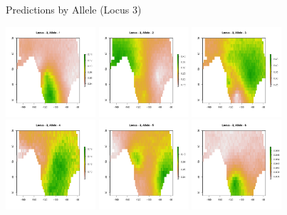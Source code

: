 \documentclass[11pt,ignorenonframetext,]{beamer}
\begin{document}
\begin{frame}{Predictions by Allele (Locus 3)}

\begin{center}
\includegraphics[width=0.25\textwidth]{figs/allele3/Med-Al3-1.png}
\includegraphics[width=0.25\textwidth]{figs/allele3/Med-Al3-2.png}
\includegraphics[width=0.25\textwidth]{figs/allele3/Med-Al3-3.png} \\
\includegraphics[width=0.25\textwidth]{figs/allele3/Med-Al3-4.png}
\includegraphics[width=0.25\textwidth]{figs/allele3/Med-Al3-5.png}
\includegraphics[width=0.25\textwidth]{figs/allele3/Med-Al3-6.png} \\

\end{center}
\end{frame}
\end{document}
